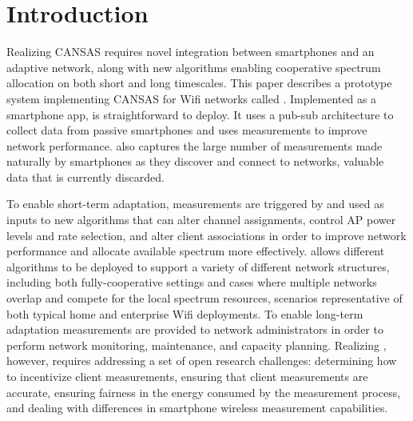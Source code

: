 \section{Introduction}


Realizing CANSAS requires novel integration between smartphones and an
adaptive network, along with new algorithms enabling cooperative spectrum
allocation on both short and long timescales. This paper describes a
prototype system implementing CANSAS for Wifi networks called \PS{}.
Implemented as a smartphone app, \PS{} is straightforward to deploy. It uses
a pub-sub architecture to collect data from passive smartphones and uses
measurements to improve network performance. \PS{} also captures the large
number of measurements made naturally by smartphones as they discover and
connect to networks, valuable data that is currently discarded.

To enable short-term adaptation, measurements are triggered by and used as
inputs to new algorithms that can alter channel assignments, control AP power
levels and rate selection, and alter client associations in order to improve
network performance and allocate available spectrum more effectively. \PS{}
allows different algorithms to be deployed to support a variety of different
network structures, including both fully-cooperative settings and cases where
multiple networks overlap and compete for the local spectrum resources,
scenarios representative of both typical home and enterprise Wifi
deployments. To enable long-term adaptation measurements are provided to
network administrators in order to perform network monitoring, maintenance,
and capacity planning. Realizing \PS{}, however, requires addressing a set of
open research challenges: determining how to incentivize client measurements,
ensuring that client measurements are accurate, ensuring fairness in the
energy consumed by the measurement process, and dealing with differences in
smartphone wireless measurement capabilities.

